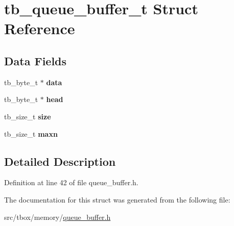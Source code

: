 \hypertarget{structtb__queue__buffer__t}{\section{tb\-\_\-queue\-\_\-buffer\-\_\-t Struct Reference}
\label{structtb__queue__buffer__t}
}
\subsection*{Data Fields}
\begin{DoxyCompactItemize}
\item 
\hypertarget{structtb__queue__buffer__t_afefcf50208620a9bb6a509acda62e816}{tb\-\_\-byte\-\_\-t $\ast$ {\bfseries data}}\label{structtb__queue__buffer__t_afefcf50208620a9bb6a509acda62e816}

\item 
\hypertarget{structtb__queue__buffer__t_a4f6378d9478e82363cac7636d756b2fd}{tb\-\_\-byte\-\_\-t $\ast$ {\bfseries head}}\label{structtb__queue__buffer__t_a4f6378d9478e82363cac7636d756b2fd}

\item 
\hypertarget{structtb__queue__buffer__t_ad817effe8e1e9f9ba9ff97c42e2dbc83}{tb\-\_\-size\-\_\-t {\bfseries size}}\label{structtb__queue__buffer__t_ad817effe8e1e9f9ba9ff97c42e2dbc83}

\item 
\hypertarget{structtb__queue__buffer__t_a4afbe5ee9bbad02a6fe9b07308fb15d6}{tb\-\_\-size\-\_\-t {\bfseries maxn}}\label{structtb__queue__buffer__t_a4afbe5ee9bbad02a6fe9b07308fb15d6}

\end{DoxyCompactItemize}


\subsection{Detailed Description}


Definition at line 42 of file queue\-\_\-buffer.\-h.



The documentation for this struct was generated from the following file\-:\begin{DoxyCompactItemize}
\item 
src/tbox/memory/\hyperlink{queue__buffer_8h}{queue\-\_\-buffer.\-h}\end{DoxyCompactItemize}
